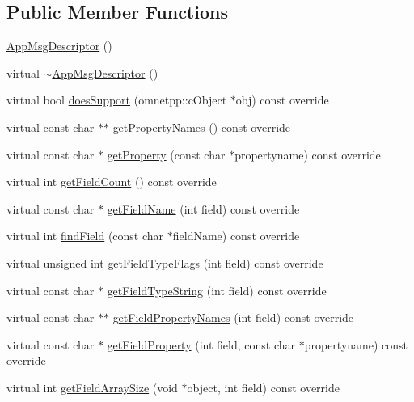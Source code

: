 \subsection*{Public Member Functions}
\begin{DoxyCompactItemize}
\item 
\hyperlink{class_app_msg_descriptor_a6db2ddcf43396f5c9f97311e757e3b51}{App\+Msg\+Descriptor} ()
\item 
virtual \hyperlink{class_app_msg_descriptor_ab164a07b536b9fba949565b8717dc502}{$\sim$\+App\+Msg\+Descriptor} ()
\item 
virtual bool \hyperlink{class_app_msg_descriptor_a46278424168df1b1c695931d232903aa}{does\+Support} (omnetpp\+::c\+Object $\ast$obj) const override
\item 
virtual const char $\ast$$\ast$ \hyperlink{class_app_msg_descriptor_a463f64b1782fbb94c24696f35b3e3060}{get\+Property\+Names} () const override
\item 
virtual const char $\ast$ \hyperlink{class_app_msg_descriptor_a3aeec901180fe34d706eb995bba59e7d}{get\+Property} (const char $\ast$propertyname) const override
\item 
virtual int \hyperlink{class_app_msg_descriptor_a3f448baccbb92d3da8d5026c660a8457}{get\+Field\+Count} () const override
\item 
virtual const char $\ast$ \hyperlink{class_app_msg_descriptor_a65c09ea4375fe8dd56084e1801adbbcd}{get\+Field\+Name} (int field) const override
\item 
virtual int \hyperlink{class_app_msg_descriptor_aeb69344c912887ff0e64d4e4d5d587ba}{find\+Field} (const char $\ast$field\+Name) const override
\item 
virtual unsigned int \hyperlink{class_app_msg_descriptor_a9b354c043d42e40ffe92ccf17a3b49fa}{get\+Field\+Type\+Flags} (int field) const override
\item 
virtual const char $\ast$ \hyperlink{class_app_msg_descriptor_a332a8a40b5013ad50415638e7f0b4ddf}{get\+Field\+Type\+String} (int field) const override
\item 
virtual const char $\ast$$\ast$ \hyperlink{class_app_msg_descriptor_a9cf3ac7e1dc6b2d7262c89736aa77944}{get\+Field\+Property\+Names} (int field) const override
\item 
virtual const char $\ast$ \hyperlink{class_app_msg_descriptor_ae7df10b5c7668b06b562cab7fc5c6e27}{get\+Field\+Property} (int field, const char $\ast$propertyname) const override
\item 
virtual int \hyperlink{class_app_msg_descriptor_a5461c8b2212d7f2060de56ba67c3138e}{get\+Field\+Array\+Size} (void $\ast$object, int field) const override

\end{DoxyCompactItemize}
